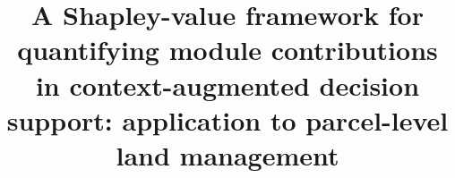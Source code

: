 \documentclass[preprint,review,12pt,authoryear]{elsarticle}
\begin{document}
\begin{frontmatter}



	\title{A Shapley-value framework for quantifying module contributions in context-augmented decision support: application to parcel-level land management}




\end{frontmatter}
\end{document}
